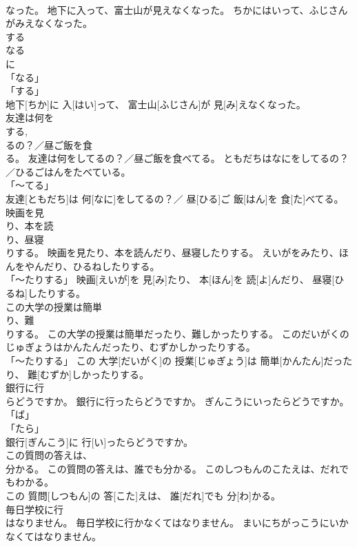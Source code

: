\documentclass[8pt]{extreport}
\begin{document}
\begin{CJK}{UTF8}{min}
\\	なった。	地下に入って、富士山が見えなくなった。	ちかにはいって、ふじさんがみえなくなった。	
\\	する 
\\	なる 
\\	に 
\\	「なる」 
\\	「する」 
\\	地下[ちか]に 入[はい]って、 富士山[ふじさん]が 見[み]えなくなった。		
\\	友達は何を
\\	する, 
\\	るの？／昼ご飯を食
\\	る。	友達は何をしてるの？／昼ご飯を食べてる。	ともだちはなにをしてるの？／ひるごはんをたべている。	
\\	「～てる」 
\\	友達[ともだち]は 何[なに]をしてるの？／ 昼[ひる]ご 飯[はん]を 食[た]べてる。		
\\	映画を見
\\	り、本を読
\\	り、昼寝
\\	りする。	映画を見たり、本を読んだり、昼寝したりする。	えいがをみたり、ほんをやんだり、ひるねしたりする。	
\\	「～たりする」	映画[えいが]を 見[み]たり、 本[ほん]を 読[よ]んだり、 昼寝[ひるね]したりする。		
\\	この大学の授業は簡単
\\	り、難
\\	りする。	この大学の授業は簡単だったり、難しかったりする。	このだいがくのじゅぎょうはかんたんだったり、むずかしかったりする。	
\\	「～たりする」	この 大学[だいがく]の 授業[じゅぎょう]は 簡単[かんたん]だったり、 難[むずか]しかったりする。		
\\	銀行に行
\\	らどうですか。	銀行に行ったらどうですか。	ぎんこうにいったらどうですか。	
\\	「ば」 
\\	「たら」 
\\	銀行[ぎんこう]に 行[い]ったらどうですか。		
\\	この質問の答えは、
\\	分かる。	この質問の答えは、誰でも分かる。	このしつもんのこたえは、だれでもわかる。	
\\	この 質問[しつもん]の 答[こた]えは、 誰[だれ]でも 分[わ]かる。		
\\	毎日学校に行
\\	はなりません。	毎日学校に行かなくてはなりません。	まいにちがっこうにいかなくてはなりません。	

\end{CJK}
\end{document}
